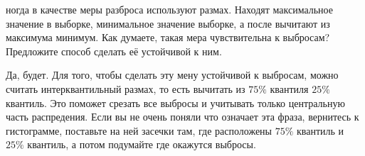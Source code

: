 \documentclass[12pt, a4paper, oneside]{article}
\theoremstyle{plain} %
\theoremstyle{definition}
\newcounter{problem}%
\renewcommand{\theproblem}{\arabic{problem}}
\newenvironment{problem}[1]{
\addtocounter{problem}{1}\noindent{ \color{titleblue} \large \bfseries Упражнение~\theproblem~#1 \vspace{1ex} \newline}
}{ }
\begin{document}
\begin{problem}
Иногда в качестве меры разброса используют размах. Находят максимальное значение в выборке, минимальное значение выборке, а после вычитают из максимума минимум. Как думаете, такая мера чувствительна к выбросам? Предложите способ сделать её устойчивой к ним.
\end{problem}

\begin{solution}
Да, будет. Для того, чтобы сделать эту мену устойчивой к выбросам, можно считать интерквантильный размах, то есть вычитать из $75\%$ квантиля $25\%$ квантиль. Это поможет срезать все выбросы и учитывать только центральную часть распредения. Если вы не очень поняли что означает эта фраза, вернитесь к гистограмме, поставьте на ней засечки там, где расположены $75\%$ квантиль и $25\%$ квантиль, а потом подумайте где окажутся выбросы. 
\end{solution}



\end{document}
